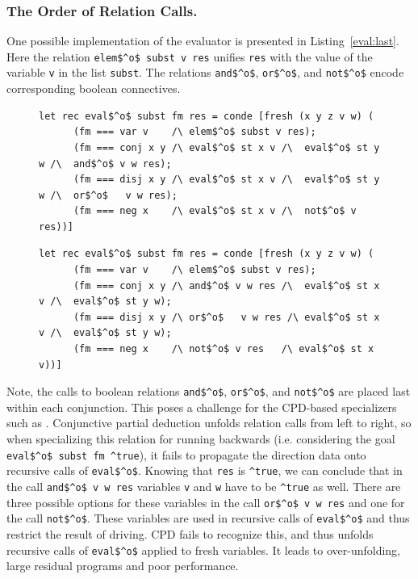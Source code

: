 \subsubsection{The Order of Relation Calls.}

One possible implementation of the evaluator is presented in Listing~\ref{eval:last}.
Here the relation \lstinline{elem$^o$ subst v res} unifies \lstinline{res} with the value of the variable \lstinline{v} in the list \lstinline{subst}.
The relations \lstinline{and$^o$}, \lstinline{or$^o$}, and \lstinline{not$^o$} encode corresponding boolean connectives.

\begin{figure}[!t]
  \centering
  \begin{minipage}{0.95\textwidth}
    \begin{lstlisting}[label={eval:last}, caption={Evaluator of formulas with boolean operation last}, captionpos=b, frame=tb]
  let rec eval$^o$ subst fm res = conde [fresh (x y z v w) (
      (fm === var v    /\ elem$^o$ subst v res);
      (fm === conj x y /\ eval$^o$ st x v /\  eval$^o$ st y w /\  and$^o$ v w res);
      (fm === disj x y /\ eval$^o$ st x v /\  eval$^o$ st y w /\  or$^o$   v w res);
      (fm === neg x    /\ eval$^o$ st x v /\  not$^o$ v res))]
    \end{lstlisting}
  \end{minipage}
  \begin{minipage}{0.95\textwidth}
    \begin{lstlisting}[label={eval:fst}, caption={Evaluator of formulas with boolean operation second}, captionpos=b, frame=tb]
  let rec eval$^o$ subst fm res = conde [fresh (x y z v w) (
      (fm === var v    /\ elem$^o$ subst v res);
      (fm === conj x y /\ and$^o$ v w res /\  eval$^o$ st x v /\  eval$^o$ st y w);
      (fm === disj x y /\ or$^o$   v w res /\ eval$^o$ st x v /\  eval$^o$ st y w);
      (fm === neg x    /\ not$^o$ v res   /\ eval$^o$ st x v))]
    \end{lstlisting}
  \end{minipage}
\end{figure}

Note, the calls to boolean relations \lstinline{and$^o$}, \lstinline{or$^o$}, and \lstinline{not$^o$} are placed last within each conjunction.
This poses a challenge for the CPD-based specializers such as \ecce.
Conjunctive partial deduction unfolds relation calls from left to right, so when specializing this relation for running backwards (i.e. considering the goal \lstinline{eval$^o$ subst fm ^true}), it fails to propagate the direction data onto recursive calls of \lstinline{eval$^o$}.
Knowing that \lstinline{res} is \lstinline{^true}, we can conclude that in the call \lstinline{and$^o$ v w res} variables \lstinline{v} and \lstinline{w} have to be \lstinline{^true} as well.
There are three possible options for these variables in the call \lstinline{or$^o$ v w res} and one for the call \lstinline{not$^o$}.
These variables are used in recursive calls of \lstinline{eval$^o$} and thus restrict the result of driving.
CPD fails to recognize this, and thus unfolds recursive calls of \lstinline{eval$^o$} applied to fresh variables.
It leads to over-unfolding, large residual programs and poor performance.

